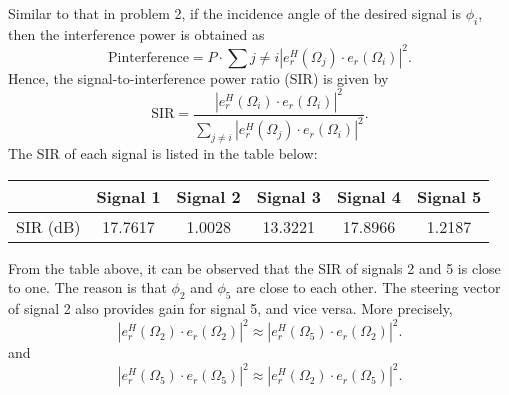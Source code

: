 Similar to that in problem 2, if the incidence angle of the desired signal is $\phi_i$, then the
interference power is obtained as
\begin{equation*}
    \text{P}{\text{interference}} = P \cdot \sum{j \neq i} \left|e_r^{H}(\Omega_j) \cdot e_r(\Omega_i)\right|^2.
\end{equation*}
Hence, the signal-to-interference power ratio (SIR) is given by
\begin{equation*}
    \text{SIR} = \frac{\left|e_r^{H}(\Omega_i) \cdot e_r(\Omega_i)\right|^2}{\sum_{j \neq i} \left|e_r^{H}(\Omega_j) \cdot e_r(\Omega_i)\right|^2}.
\end{equation*}
The SIR of each signal is listed in the table below:
\begin{table}[H]
    \centering
    \begin{tabular}{c|c|c|c|c|c}
             & Signal 1 & Signal 2 & Signal 3 & Signal 4 & Signal 5 \\
    \hline
    SIR (dB) & 17.7617 & 1.0028 & 13.3221 & 17.8966 & 1.2187
    \end{tabular}
\end{table}
From the table above, it can be observed that the SIR of signals 2 and 5 is close to one.
The reason is that $\phi_2$ and $\phi_5$ are close to each other. The steering vector of signal 2
also provides gain for signal 5, and vice versa. More precisely,
\begin{equation*}
    \left|e_r^{H}(\Omega_2) \cdot e_r(\Omega_2)\right|^2 \approx \left|e_r^{H}(\Omega_5) \cdot e_r(\Omega_2)\right|^2.
\end{equation*}
and
\begin{equation*}
    \left|e_r^{H}(\Omega_5) \cdot e_r(\Omega_5)\right|^2 \approx \left|e_r^{H}(\Omega_2) \cdot e_r(\Omega_5)\right|^2.
\end{equation*}